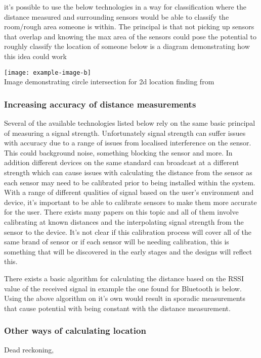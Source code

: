 it's possible to use the below technologies in a way for classification where the distance measured and surrounding sensors would be able to classify the room/rough area someone is within. The principal is that not picking up sensors that overlap and knowing the max area of the sensors could pose the potential to roughly classify the location of someone below is a diagram demonstrating how this idea could work

\begin{center}
	\texttt{[image: example-image-b]}\\
	Image demonstrating circle intersection for 2d location finding from \citetemp
\end{center}

\subsubsection{Increasing accuracy of distance measurements}
Several of the available technologies listed below rely on the same basic principal of measuring a signal strength. Unfortunately signal strength can suffer issues with accuracy due to a range of issues from localised interference on the sensor. This could background noise, something blocking the sensor and more. In addition different devices on the same standard can broadcast at a different strength which can cause issues with calculating the distance from the sensor as each sensor may need to be calibrated prior to being installed within the system. With a range of different qualities of signal based on the user’s environment and device, it’s important to be able to calibrate sensors to make them more accurate for the user. There exists many papers on this topic and all of them involve calibrating at known distances and the interpolating signal strength from the sensor to the device. It's not clear if this calibration process will cover all of the same brand of sensor or if each sensor will be needing calibration, this is something that will be discovered in the early stages and the designs will reflect this.

There exists a basic algorithm for calculating the distance based on the RSSI value of the received signal in example the one found for Bluetooth is below.\\

Using the above algorithm on it's own would result in sporadic measurements that cause potential with being constant with the distance measurement. 

\subsubsection{Other ways of calculating location}
Dead reckoning, 
